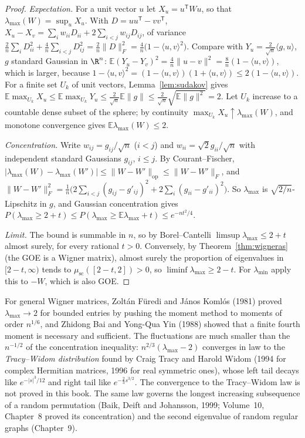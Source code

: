 \begin{proof}
\emph{Expectation.} For a unit vector $u$ let $X_u=u^{\mathsf T}Wu$, so that $\lambda_{\max}(W)=\sup_uX_u$. With $D=uu^{\mathsf T}-vv^{\mathsf T}$, $X_u-X_v=\sum_iw_{ii}D_{ii}+2\sum_{i<j}w_{ij}D_{ij}$, of variance
$\frac2n\sum_iD_{ii}^2+\frac4n\sum_{i<j}D_{ij}^2=\frac2n\|D\|_F^2=\frac4n\bigl(1-\langle u,v\rangle^2\bigr)$. Compare with $Y_u=\frac2{\sqrt n}\langle g,u\rangle$, $g$ standard Gaussian in $\R^n$:
$\mathbb E(Y_u-Y_v)^2=\frac4n\|u-v\|^2=\frac8n(1-\langle u,v\rangle)$, which is larger, because $1-\langle u,v\rangle^2=(1-\langle u,v\rangle)(1+\langle u,v\rangle)\le2(1-\langle u,v\rangle)$. For a finite set $U_k$ of unit vectors,
Lemma~\ref{lem:sudakov} gives $\mathbb E\max_{U_k}X_u\le\mathbb E\max_{U_k}Y_u\le\frac2{\sqrt n}\mathbb E\|g\|\le\frac2{\sqrt n}\sqrt{\mathbb E\|g\|^2}=2$. Let $U_k$ increase to a countable dense subset of the sphere; by continuity
$\max_{U_k}X_u\uparrow\lambda_{\max}(W)$, and monotone convergence gives $\mathbb E\lambda_{\max}(W)\le2$.

\emph{Concentration.} Write $w_{ij}=g_{ij}/\sqrt n$ ($i<j$) and $w_{ii}=\sqrt2g_{ii}/\sqrt n$ with independent standard Gaussians $g_{ij}$, $i\le j$. By Courant--Fischer, $|\lambda_{\max}(W)-\lambda_{\max}(W')|\le\|W-W'\|_{\mathrm{op}}\le\|W-W'\|_F$, and
$\|W-W'\|_F^2=\frac1n\bigl(2\sum_{i<j}(g_{ij}-g'_{ij})^2+2\sum_i(g_{ii}-g'_{ii})^2\bigr)$. So $\lambda_{\max}$ is $\sqrt{2/n}$-Lipschitz in $g$, and Gaussian concentration gives $P(\lambda_{\max}\ge2+t)\le P(\lambda_{\max}\ge\mathbb E\lambda_{\max}+t)\le e^{-nt^2/4}$.

\emph{Limit.} The bound is summable in $n$, so by Borel--Cantelli $\limsup\lambda_{\max}\le2+t$ almost surely, for every rational $t>0$. Conversely, by Theorem~\ref{thm:wigneras} (the GOE is a Wigner matrix), almost surely the
proportion of eigenvalues in $[2-t,\infty)$ tends to $\mu_{\mathrm{sc}}([2-t,2])>0$, so $\liminf\lambda_{\max}\ge2-t$. For $\lambda_{\min}$ apply this to $-W$, which is also GOE.
\end{proof}

\begin{remark}
For general Wigner matrices, Zolt\'an F\"uredi and J\'anos Koml\'os (1981) proved $\lambda_{\max}\to2$ for bounded entries by pushing the moment method to moments of order $n^{1/6}$, and Zhidong Bai and Yong-Qua Yin (1988) showed that a
finite fourth moment is necessary and sufficient. The fluctuations are much smaller than the $n^{-1/2}$ of the concentration inequality: $n^{2/3}(\lambda_{\max}-2)$ converges in law to the \emph{Tracy--Widom distribution} found by
Craig Tracy and Harold Widom (1994 for complex Hermitian matrices, 1996 for real symmetric ones), whose left tail decays like $e^{-|s|^3/12}$ and right tail like $e^{-\frac23s^{3/2}}$. The convergence to the Tracy--Widom law is not proved in this book. The same law governs the longest
increasing subsequence of a random permutation (Baik, Deift and Johansson, 1999; Volume~10, Chapter~8 proved its concentration) and the second eigenvalue of random regular graphs (Chapter~9).
\end{remark}

